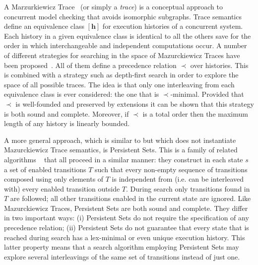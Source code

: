 A Marzurkiewicz Trace~\citep{mazurkiewicz86} (or simply a \emph{trace}) is a conceptual approach to
concurrent model checking that avoids isomorphic subgraphs.  Trace semantics define an equivalence
class $[\mathbf h]$ for execution histories of a concurrent system. Each history in a given
equivalence class is identical to all the others save for the order in which interchangeable and
independent computations occur.  A number of different strategies for searching in the space of
Mazurckiewicz Traces have been proposed~\citep{esparza08}. All of them define a precedence relation
$\prec$ over histories. This is combined with a strategy such as depth-first search in order to
explore the space of all possible traces.  The idea is that only one interleaving from each
equivalence class is ever considered: the one that is $\prec$-minimal.  Provided that $\prec$ is
well-founded and preserved by extensions it can be shown that this strategy is both sound and
complete.  Moreover, if $\prec$ is a total order then the maximum length of any history is linearly
bounded.

A more general approach, which is similar to but which does not instantiate Mazurckiewicz Trace
semantics, is Persistent Sets. This is a family of related algorithms
~\citep{overman82,valmari89,godefroid91,godefroid96,wehrle12,alkhazraji12} that all
proceed in a similar manner: they construct in each state $s$ a set of enabled transitions $T$ such
that every non-empty sequence of transitions composed using only elements of $T$ is independent from
(i.e. can be interleaved with) every enabled transition outside $T$. During search only transitions
found in $T$ are followed; all other transitions enabled in the current state are ignored.  Like
Mazurckiewicz Traces, Persistent Sets are both sound and complete. They differ in two important
ways: (i) Persistent Sets do not require the specification of any precedence relation; (ii)
Persistent Sets do not guarantee that every state that is reached during search has a lex-minimal or
even unique execution history. This latter property means that a search algorithm employing
Persistent Sets may explore several interleavings of the same set of transitions instead of just
one.

